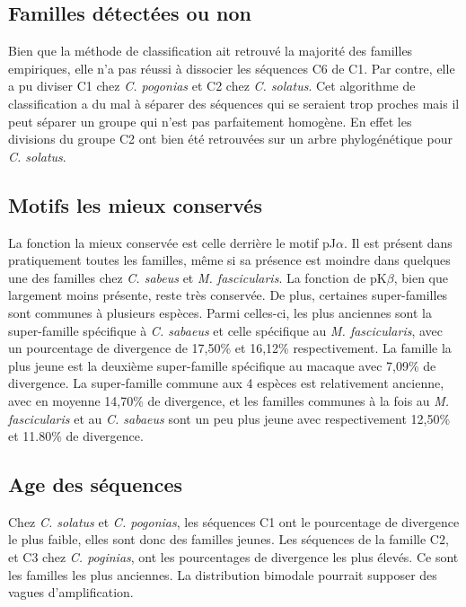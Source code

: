 \documentclass[12pt,a4paper]{article}
\begin{document}
	\subsection{Familles détectées ou non}
	Bien que la méthode de classification ait retrouvé la majorité des familles empiriques, elle n'a pas réussi à dissocier les séquences C6 de C1. Par contre, elle a pu diviser C1 chez \textit{C. pogonias} et C2  chez \textit{C. solatus}. Cet algorithme de classification a du mal à séparer des séquences qui se seraient trop proches mais il peut séparer un groupe qui n'est pas parfaitement homogène. En effet les divisions du groupe C2 ont bien été retrouvées sur un arbre phylogénétique pour \textit{C. solatus}.
	\subsection{Motifs les mieux conservés}
	La fonction la mieux conservée est celle derrière le motif pJ$\alpha$. Il est présent dans pratiquement toutes les familles, même si sa présence est moindre dans quelques une des familles chez \textit{C. sabeus} et \textit{M. fascicularis}. La fonction de pK$\beta$, bien que largement moins présente, reste très conservée. De plus, certaines super-familles sont communes à plusieurs espèces. Parmi celles-ci, les plus anciennes sont la super-famille spécifique à \textit{C. sabaeus} et celle spécifique au \textit{M. fascicularis}, avec un pourcentage de divergence de 17,50\% et 16,12\% respectivement. La famille la plus jeune est la deuxième super-famille spécifique au macaque avec 7,09\% de divergence.  La super-famille commune aux 4 espèces est relativement ancienne, avec en moyenne 14,70\% de divergence, et les familles communes à la fois au \textit{M. fascicularis} et au \textit{C. sabaeus} sont un peu plus jeune avec respectivement 12,50\% et 11.80\% de divergence.
	\subsection{Age des séquences}
	Chez \textit{C. solatus} et \textit{C. pogonias}, les séquences C1 ont le pourcentage de divergence le plus faible, elles sont donc des familles jeunes. Les séquences de la famille C2, et C3 chez \textit{C. poginias}, ont les pourcentages de divergence les plus élevés. Ce sont les familles les plus anciennes.  La distribution bimodale pourrait supposer des vagues d'amplification.
\end{document}

